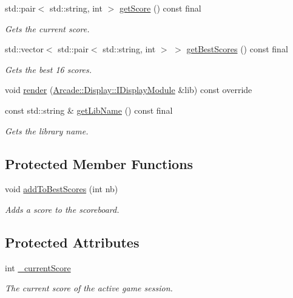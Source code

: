 \begin{DoxyCompactItemize}
std\+::pair$<$ std\+::string, int $>$ \mbox{\hyperlink{classArcade_1_1Games_1_1AGameModule_a83dbf1572ae5e25174bc7b81fed7ba77}{get\+Score}} () const final
\begin{DoxyCompactList}\small\item\em Gets the current score. \end{DoxyCompactList}\item 
std\+::vector$<$ std\+::pair$<$ std\+::string, int $>$ $>$ \mbox{\hyperlink{classArcade_1_1Games_1_1AGameModule_aaebba3bd5236f97cb18867fe99c7135b}{get\+Best\+Scores}} () const final
\begin{DoxyCompactList}\small\item\em Gets the best 16 scores. \end{DoxyCompactList}\item 
void \mbox{\hyperlink{classArcade_1_1Games_1_1AGameModule_a5897780d42d5faba3287c29b87f2b498}{render}} (\mbox{\hyperlink{classArcade_1_1Display_1_1IDisplayModule}{Arcade\+::\+Display\+::\+I\+Display\+Module}} \&lib) const override
\item 
const std\+::string \& \mbox{\hyperlink{classArcade_1_1Games_1_1AGameModule_a3245a3ba2eac74eadf5041bc3806ed6b}{get\+Lib\+Name}} () const final
\begin{DoxyCompactList}\small\item\em Gets the library name. \end{DoxyCompactList}\end{DoxyCompactItemize}
\subsection*{Protected Member Functions}
\begin{DoxyCompactItemize}
\item 
void \mbox{\hyperlink{classArcade_1_1Games_1_1AGameModule_a961c4a606bcc5d2ab1ead8b3c0bb3408}{add\+To\+Best\+Scores}} (int nb)
\begin{DoxyCompactList}\small\item\em Adds a score to the scoreboard. \end{DoxyCompactList}\end{DoxyCompactItemize}
\subsection*{Protected Attributes}
\begin{DoxyCompactItemize}
\item 
\mbox{\label{classArcade_1_1Games_1_1AGameModule_aec19427e257bb35879871c6853f51a8f}} 
int \mbox{\hyperlink{classArcade_1_1Games_1_1AGameModule_aec19427e257bb35879871c6853f51a8f}{\+\_\+current\+Score}}
\begin{DoxyCompactList}\small\item\em The current score of the active game session. \end{DoxyCompactList}\end{DoxyCompactItemize}


